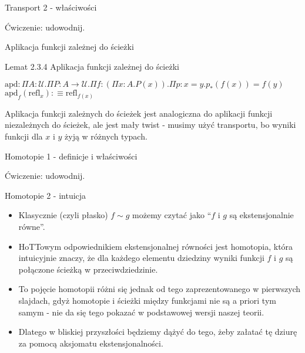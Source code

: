\documentclass{beamer}
\newcommand{\defn}{:\equiv}
\newcommand{\U}{\mathcal{U}}
\newcommand{\refl}[1]{\text{refl}_{#1}}
\newcommand{\apd}[2]{\text{apd}_{#1}(#2)}
\begin{document}
\begin{frame}{Transport 2 - właściwości}


Ćwiczenie: udowodnij.

\end{frame}

\begin{frame}{Aplikacja funkcji zależnej do ścieżki}

\begin{block}{Lemat 2.3.4 Aplikacja funkcji zależnej do ścieżki}

$\text{apd} : \Pi A : \U. \Pi P : A \to \U. \Pi f : (\Pi x : A. P(x)). \Pi p : x = y. p_*(f(x)) = f(y)$ \\
$\apd{f}{\refl{x}} \defn \refl{f(x)}$

\end{block}

Aplikacja funkcji zależnych do ścieżek jest analogiczna do aplikacji funkcji niezależnych do ścieżek, ale jest mały twist - musimy użyć transportu, bo wyniki funkcji dla $x$ i $y$ żyją w różnych typach.

\end{frame}

\begin{frame}{Homotopie 1 - definicje i właściwości}


Ćwiczenie: udowodnij.

\end{frame}

\begin{frame}{Homotopie 2 - intuicja}
\begin{itemize}
	\item Klasycznie (czyli płasko) $f \sim g$ możemy czytać jako ``$f$ i $g$ są ekstensjonalnie równe''.
	\item HoTTowym odpowiednikiem ekstensjonalnej równości jest homotopia, która intuicyjnie znaczy, że dla każdego elementu dziedziny wyniki funkcji $f$ i $g$ są połączone ścieżką w przeciwdziedzinie.
	\item To pojęcie homotopii różni się jednak od tego zaprezentowanego w pierwszych slajdach, gdyż homotopie i ścieżki między funkcjami nie są a priori tym samym - nie da się tego pokazać w podstawowej wersji naszej teorii.
	\item Dlatego w bliskiej przyszłości będziemy dążyć do tego, żeby załatać tę dziurę za pomocą aksjomatu ekstensjonalności.
\end{itemize}
\end{frame}
\end{document}
